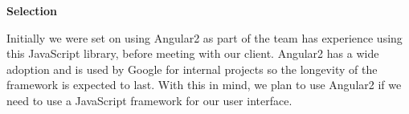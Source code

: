 \documentclass[letterpaper, 10pt, draftclsnofoot, compsoc, onecolumn]{IEEEtran}
\begin{document}
{\medskip
{\noindent\rmfamily\bfseries\color{black} Selection \par}
{\noindent Initially we were set on using Angular2 as part of the team has experience using this JavaScript library, before meeting with our client. Angular2 has a wide adoption and is used by Google for internal projects so the longevity of the framework is expected to last. With this in mind, we plan to use Angular2 if we need to use a JavaScript framework for our user interface. \par}



\begin{comment}
\newpage
\subsubsection{Documentation}
{\noindent Option 1 - Microsoft Word \cite{Word} \par}
{\noindent  Microsoft Word is a fairly powerful and widespread software that is often used for documentation outside of higher education and the technology industry. \par}

\medskip
{\noindent Option 2 - Dozuki \cite{Dozuki} \par}
{\noindent Integrates revisions, approval, and documentation into a single system that allows for efficient work-flows for creating customizable and centrally managed documentation. \par}

\medskip
{\noindent Option 3 - LaTeX \cite{Latex} \par}
{\noindent  LaTeX, hereby known as Latex, is a document preparation system often used in the technical and scientific fields for documentation, and is the de facto standard for communication and publication of scientific documents \cite{Latex}. \par}

\medskip
{\noindent\rmfamily\bfseries\color{black} Goals \par}
{\noindent An efficient documentation solution that is able to provide the ability to create beautiful and useful documentation of  the platform. This documentation will assist the end user with operation of the various parts of the platform.\par}

\medskip
\newpage
{\noindent\rmfamily\bfseries\color{black} Evaluation Criteria \par}
{\noindent The options are evaluated on 


\end{comment}}
\end{document}
